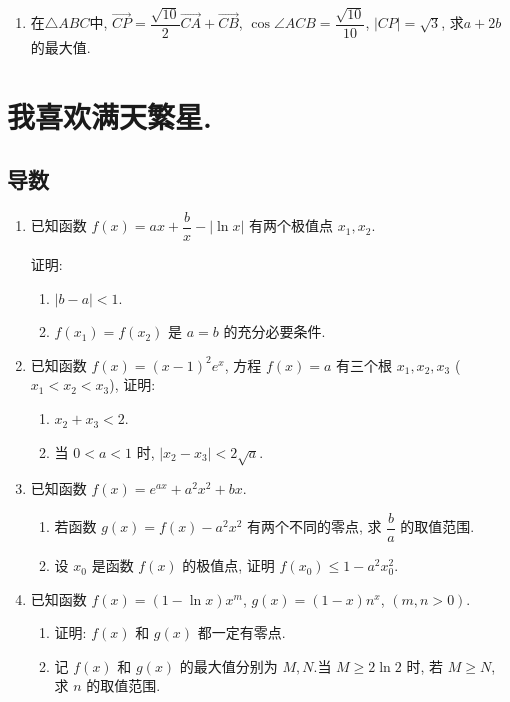 \documentclass[12pt, a4paper, oneside]{ctexart}
\begin{document}
\begin{enumerate}[leftmargin=*]
      \item 在$\triangle ABC$中, $\overrightarrow{CP}=\dfrac{\sqrt{10} }{2}\overrightarrow{CA}+\overrightarrow{CB}   $, $\cos \angle ACB=\dfrac{\sqrt{10} }{10}$, $\left\lvert CP\right\rvert  =\sqrt{3} $, 求$a+2b$的最大值.
  \end{enumerate}

\section{我喜欢满天繁星.}

\subsection{导数}

\begin{enumerate}[leftmargin=*]
    \item 已知函数 $f(x)=ax+\dfrac{b}{x}-\left\lvert \ln x\right\rvert$ 有两个极值点 $x_1, x_2$.
    
    证明:
          \begin{enumerate}
              \item $\left\lvert b-a\right\rvert <1$.
              \item $f(x_1) = f(x_2)$ 是 $a=b$ 的充分必要条件.
          \end{enumerate}
          \vspace*{2\baselineskip}
    \item 已知函数 $f(x)=\left( x-1 \right)^2 e^x$, 方程 $f(x)=a$ 有三个根 $x_1, x_2, x_3$ ($x_1 < x_2 < x_3$), 证明:
          \begin{enumerate}
              \item $x_2 + x_3 < 2$.
              \item 当 $0 < a < 1$ 时, $\left\lvert x_2 - x_3 \right\rvert < 2 \sqrt{a}$.
          \end{enumerate}
          \vspace*{2\baselineskip}
    \item 已知函数 $f(x)=e^{ax} + a^2 x^2 + bx$.
          \begin{enumerate}
              \item 若函数 $g(x)=f(x) - a^2 x^2$ 有两个不同的零点, 求 $\dfrac{b}{a}$ 的取值范围.
              \item 设 $x_0$ 是函数 $f(x)$ 的极值点, 证明 $f(x_0) \leqslant 1-a^2 x_0^2$.
          \end{enumerate}
          \vspace*{2\baselineskip}
    \item 已知函数 $f(x)=\left(1-\ln x\right)x^m$, $g(x)=\left(1-x\right)n^x$, $(m, n>0)$.
          \begin{enumerate}
              \item 证明: $f(x)$ 和 $g(x)$ 都一定有零点.
              \item 记 $f(x)$ 和 $g(x)$ 的最大值分别为 $M, N$.当 $M \geqslant 2 \ln 2$ 时, 若 $M \geqslant N$, 求 $n$ 的取值范围.
          \end{enumerate}
\end{enumerate}
\end{document}
